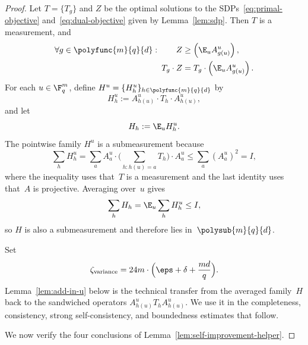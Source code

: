\begin{proof}
  \leanok
  Let $T=\{T_g\}$ and $Z$ be the optimal solutions to the SDPs~\eqref{eq:primal-objective} and~\eqref{eq:dual-objective} given by Lemma~\ref{lem:sdp}. Then $T$ is a measurement, and
  \begin{align}
    \forall g \in \polyfunc{m}{q}{d}: \qquad
    Z &\geq \left(\E_{u} A^{u}_{g(u)}\right), \label{eq:Z-greater-than-A}\\
    T_g \cdot Z &= T_g \cdot \left(\E_{u} A^{u}_{g(u)}\right). \label{eq:swap-Z-for-A}
  \end{align}
  For each $u \in \F_q^m$, define $H^u=\{H_h^u\}_{h \in \polyfunc{m}{q}{d}}$ by
  \[
    H_h^u := A^u_{h(u)} \cdot T_h \cdot A^u_{h(u)},
  \]
  and let
  \[
    H_h := \E_{u} H_h^u.
  \]
  The pointwise family $H^u$ is a submeasurement because
  \[
    \sum_h H_h^u
    = \sum_a A_a^u \cdot \Big(\sum_{h:h(u)=a} T_h\Big)\cdot A_a^u
    \le \sum_a (A_a^u)^2
    = I,
  \]
  where the inequality uses that~$T$ is a measurement and the last identity uses
  that~$A$ is projective. Averaging over~$u$ gives
  \[
    \sum_h H_h
    = \E_{u} \sum_h H_h^u
    \le I,
  \]
  so $H$ is also a submeasurement and therefore lies in~$\polysub{m}{q}{d}$.

  Set
  \[
    \zeta_{\mathrm{variance}} = 24m\cdot\Big(\eps + \delta + \frac{md}{q}\Big).
  \]
  Lemma~\ref{lem:add-in-u} below is the technical transfer from the averaged family~$H$ back to the sandwiched operators $A^u_{h(u)}T_hA^u_{h(u)}$. We use it in the completeness, consistency, strong self-consistency, and boundedness estimates that follow.

  We now verify the four conclusions of Lemma~\ref{lem:self-improvement-helper}.


\end{proof}
